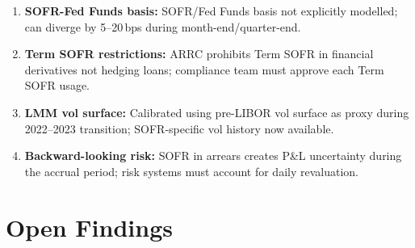 \documentclass{apex_mdd}
\begin{document}
\begin{enumerate}
  \item \textbf{SOFR-Fed Funds basis:} SOFR/Fed Funds basis not explicitly modelled; can diverge by 5--20\,bps during month-end/quarter-end.
  \item \textbf{Term SOFR restrictions:} ARRC prohibits Term SOFR in financial derivatives not hedging loans; compliance team must approve each Term SOFR usage.
  \item \textbf{LMM vol surface:} Calibrated using pre-LIBOR vol surface as proxy during 2022--2023 transition; SOFR-specific vol history now available.
  \item \textbf{Backward-looking risk:} SOFR in arrears creates P\&L uncertainty during the accrual period; risk systems must account for daily revaluation.
\end{enumerate}

\section{Open Findings}

\begin{findings}
\end{findings}
\end{document}
